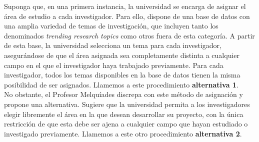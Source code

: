 \documentclass[a4paper, answers, addpoints, 11pt]{exam}
\begin{document}
Suponga que, en una primera instancia, la universidad se encarga de asignar el área de estudio a cada investigador. Para ello, dispone de una base de datos con una amplia variedad de temas de investigación, que incluyen tanto los denominados \textit{trending research topics} como otros fuera de esta categoría. A partir de esta base, la universidad selecciona un tema para cada investigador, asegurándose de que el área asignada sea completamente distinta a cualquier campo en el que el investigador haya trabajado previamente. Para cada investigador, todos los temas disponibles en la base de datos tienen la misma posibilidad de ser asignados. Llamemos a este procedimiento \textbf{alternativa 1}. \\

No obstante, el Profesor Melquíades discrepa con este método de asignación y propone una alternativa. Sugiere que la universidad permita a los investigadores elegir libremente el área en la que desean desarrollar su proyecto, con la única restricción de que esta debe ser ajena a cualquier campo que hayan estudiado o investigado previamente. Llamemos a este otro procedimiento \textbf{alternativa 2}.
\end{document}
